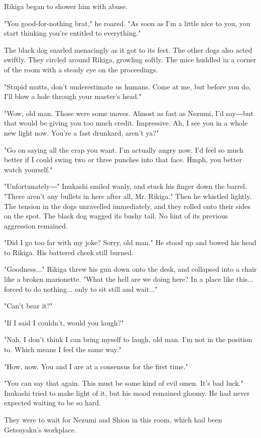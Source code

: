 Rikiga began to shower him with abuse.

"You good-for-nothing brat," he roared. "As soon as I'm a little nice to
you, you start thinking you're entitled to everything."

The black dog snarled menacingly as it got to its feet. The other dogs
also acted swiftly. They circled around Rikiga, growling softly. The
mice huddled in a corner of the room with a steady eye on the
proceedings.

"Stupid mutts, don't underestimate us humans. Come at me, but before you
do, I'll blow a hole through your master's head."

"Wow, old man. Those were some moves. Almost as fast as Nezumi, I'd
say―but that would be giving you too much credit. Impressive. Ah, I see
you in a whole new light now. You're a fast drunkard, aren't ya?"

"Go on saying all the crap you want. I'm actually angry now. I'd feel so
much better if I could swing two or three punches into that face. Hmph,
you better watch yourself."

"Unfortunately―" Inukashi smiled wanly, and stuck his finger down the
barrel. "There aren't any bullets in here after all, Mr. Rikiga." Then
he whistled lightly. The tension in the dogs unravelled immediately, and
they rolled onto their sides on the spot. The black dog wagged its bushy
tail. No hint of its previous aggression remained.

"Did I go too far with my joke? Sorry, old man." He stood up and bowed
his head to Rikiga. His battered cheek still burned.

"Goodness..." Rikiga threw his gun down onto the desk, and collapsed
into a chair like a broken marionette. "What the hell are we doing here?
In a place like this... forced to do nothing... only to sit still and
wait..."

"Can't bear it?"

"If I said I couldn't, would you laugh?"

"Nah. I don't think I can bring myself to laugh, old man. I'm not in the
position to. Which means I feel the same way."

"How, now. You and I are at a consensus for the first time."

"You can say that again. This must be some kind of evil omen. It's bad
luck." Inukashi tried to make light of it, but his mood remained gloomy.
He had never expected waiting to be so hard.

They were to wait for Nezumi and Shion in this room, which had been
Getsuyaku's workplace.

